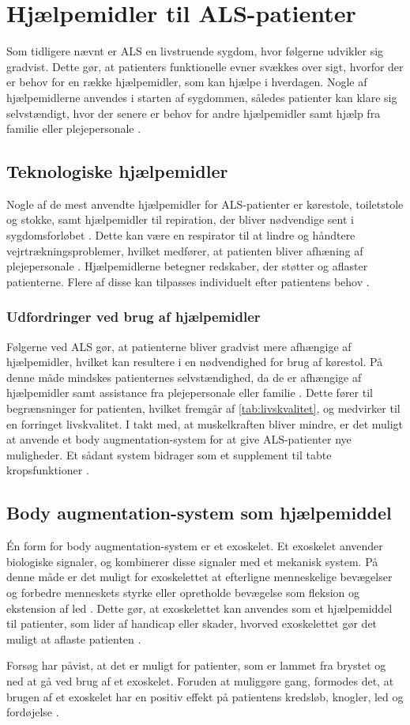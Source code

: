 \section{Hjælpemidler til ALS-patienter} \label{sec:teknologier}
Som tidligere nævnt er ALS en livstruende sygdom, hvor følgerne udvikler sig gradvist. Dette gør, at patienters funktionelle evner svækkes over sigt, hvorfor der er behov for en række hjælpemidler, som kan hjælpe i hverdagen. Nogle af hjælpemidlerne anvendes i starten af sygdommen, således patienter kan klare sig selvstændigt, hvor der senere er behov for andre hjælpemidler samt hjælp fra familie eller plejepersonale \citep{brandt2010}.

\subsection{Teknologiske hjælpemidler}
Nogle af de mest anvendte hjælpemidler for ALS-patienter er kørestole, toiletstole og stokke, \citep{brandt2010} samt hjælpemidler til repiration, der bliver nødvendige sent i sygdomsforløbet \citep{hefferman2006}. Dette kan være en respirator til at lindre og håndtere vejrtrækningsproblemer, hvilket medfører, at patienten bliver afhæning af plejepersonale \citep{rcfm2001}. 
Hjælpemidlerne betegner redskaber, der støtter og aflaster patienterne. Flere af disse kan tilpasses individuelt efter patientens behov \citep{brandt2010}.


\subsubsection{Udfordringer ved brug af hjælpemidler}
Følgerne ved ALS gør, at patienterne bliver gradvist mere afhængige af hjælpemidler, hvilket kan resultere i en nødvendighed for brug af kørestol.   
På denne måde mindskes patienternes selvstændighed, da de er afhængige af hjælpemidler samt assistance fra plejepersonale eller familie \citep{brandt2010}. Dette fører til begrænsninger for patienten, hvilket fremgår af \autoref{tab:livskvalitet}, og medvirker til en forringet livskvalitet. I takt med, at muskelkraften bliver mindre, er det muligt at anvende et body augmentation-system for at give ALS-patienter nye muligheder. 
Et sådant system bidrager som et supplement til tabte kropsfunktioner \citep{erlen2003}.


\subsection{Body augmentation-system som hjælpemiddel}
Én form for body augmentation-system er et exoskelet. Et exoskelet anvender biologiske signaler, og kombinerer disse signaler med et mekanisk system. På denne måde er det muligt for exoskelettet at efterligne menneskelige bevægelser og forbedre menneskets styrke eller opretholde bevægelse som fleksion og ekstension af led \citep{yang2008}. Dette gør, at exoskelettet kan anvendes som et hjælpemiddel til patienter, som lider af handicap eller skader, hvorved exoskelettet gør det muligt at aflaste patienten \citep{bogue2015}.  

Forsøg har påvist, at det er muligt for patienter, som er lammet fra brystet og ned at gå ved brug af et exoskelet. Foruden at muliggøre gang, formodes det, at brugen af et exoskelet har en positiv effekt på patientens kredsløb, knogler, led og fordøjelse \citep{regmidt2015}. 